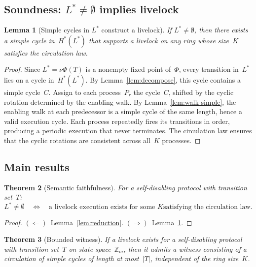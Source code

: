 \documentclass{article}
\newtheorem{theorem}{Theorem}
\newtheorem{lemma}[theorem]{Lemma}
\newcommand{\Zm}{\mathbb{Z}_m}
\newcommand{\Hstar}{H^{*}}
\newcommand{\Lstar}{L^{*}}
\begin{document}
\subsection{Soundness:
\texorpdfstring{$\Lstar \neq \emptyset$}{L* nonempty}
implies livelock}

\begin{lemma}[Simple cycles in $\Lstar$ construct a livelock]
\label{lem:construction}
If $\Lstar \neq \emptyset$, then there exists a simple cycle
in~$\Hstar(\Lstar)$ that supports a livelock on any ring
whose size~$K$ satisfies the circulation law.
\end{lemma}

\begin{proof}
Since $\Lstar = \nu\Phi(T)$ is a nonempty fixed point of~$\Phi$,
every transition in~$\Lstar$ lies on a cycle
in~$\Hstar(\Lstar)$.
By Lemma~\ref{lem:decompose}, this cycle contains a simple
cycle~$C$.
Assign to each process~$P_r$ the cycle~$C$, shifted by the
cyclic rotation determined by the enabling walk.
By Lemma~\ref{lem:walk-simple}, the enabling walk at each
predecessor is a simple cycle of the same length, hence
a valid execution cycle.
Each process repeatedly fires its transitions in order,
producing a periodic execution that never terminates.
The circulation law ensures that the cyclic rotations are
consistent across all~$K$ processes.
\end{proof}

\subsection{Main results}

\begin{theorem}[Semantic faithfulness]\label{thm:faithful}
For a self-disabling protocol with transition set~$T$:
\[
  \Lstar \neq \emptyset
  \quad\Longleftrightarrow\quad
  \text{a livelock execution exists for some~$K$
  satisfying the circulation law.}
\]
\end{theorem}

\begin{proof}
$(\Leftarrow)$~Lemma~\ref{lem:reduction}.
$(\Rightarrow)$~Lemma~\ref{lem:construction}.
\end{proof}

\begin{theorem}[Bounded witness]\label{thm:bounded}
If a livelock exists for a self-disabling protocol with
transition set~$T$ on state space~$\Zm$, then it admits
a witness consisting of a circulation of simple cycles
of length at most~$|T|$, independent of the ring size~$K$.
\end{theorem}
\end{document}
